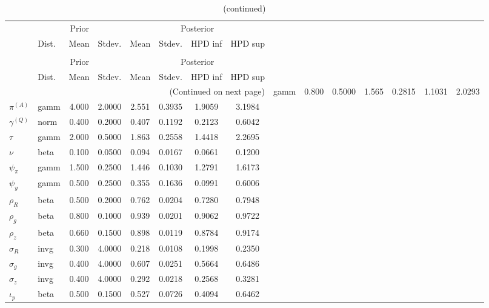  
\begin{center}
\begin{longtable}{llcccccc} 
\caption{Results from Metropolis-Hastings (parameters)}
 \label{Table:MHPosterior:1}\\
\toprule 
  & \multicolumn{3}{c}{Prior}  &  \multicolumn{4}{c}{Posterior} \\
  \cmidrule(r{.75em}){2-4} \cmidrule(r{.75em}){5-8}
  & Dist. & Mean  & Stdev. & Mean & Stdev. & HPD inf & HPD sup\\
\midrule \endfirsthead 
\caption{(continued)}\\\toprule 
  & \multicolumn{3}{c}{Prior}  &  \multicolumn{4}{c}{Posterior} \\
  \cmidrule(r{.75em}){2-4} \cmidrule(r{.75em}){5-8}
  & Dist. & Mean  & Stdev. & Mean & Stdev. & HPD inf & HPD sup\\
\midrule \endhead 
\bottomrule \multicolumn{8}{r}{(Continued on next page)} \endfoot 
\bottomrule \endlastfoot 
${r_{A}}$ & gamm &   0.800 & 0.5000 &   1.565& 0.2815 &  1.1031 &  2.0293 \\ 
${\pi^{(A)}}$ & gamm &   4.000 & 2.0000 &   2.551& 0.3935 &  1.9059 &  3.1984 \\ 
${\gamma^{(Q)}}$ & norm &   0.400 & 0.2000 &   0.407& 0.1192 &  0.2123 &  0.6042 \\ 
${\tau}$ & gamm &   2.000 & 0.5000 &   1.863& 0.2558 &  1.4418 &  2.2695 \\ 
${\nu}$ & beta &   0.100 & 0.0500 &   0.094& 0.0167 &  0.0661 &  0.1200 \\ 
${\psi_\pi}$ & gamm &   1.500 & 0.2500 &   1.446& 0.1030 &  1.2791 &  1.6173 \\ 
${\psi_y}$ & gamm &   0.500 & 0.2500 &   0.355& 0.1636 &  0.0991 &  0.6006 \\ 
${\rho_R}$ & beta &   0.500 & 0.2000 &   0.762& 0.0204 &  0.7280 &  0.7948 \\ 
${\rho_{g}}$ & beta &   0.800 & 0.1000 &   0.939& 0.0201 &  0.9062 &  0.9722 \\ 
${\rho_z}$ & beta &   0.660 & 0.1500 &   0.898& 0.0119 &  0.8784 &  0.9174 \\ 
${\sigma_R}$ & invg &   0.300 & 4.0000 &   0.218& 0.0108 &  0.1998 &  0.2350 \\ 
${\sigma_{g}}$ & invg &   0.400 & 4.0000 &   0.607& 0.0251 &  0.5664 &  0.6486 \\ 
${\sigma_z}$ & invg &   0.400 & 4.0000 &   0.292& 0.0218 &  0.2568 &  0.3281 \\ 
${\iota_p}$ & beta &   0.500 & 0.1500 &   0.527& 0.0726 &  0.4094 &  0.6462 \\ 
\end{longtable}
 \end{center}
